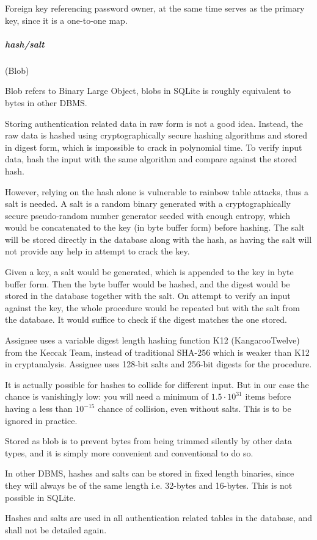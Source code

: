 Foreign key referencing password owner, at the same time serves as the primary
key, since it is a one-to-one map.

\subparagraph{hash/salt}
(Blob) \label{data-layer.design.user.tables.pswd.crypt}

Blob refers to Binary Large Object, blobs in SQLite is roughly equivalent to
bytes in other DBMS.

Storing authentication related data in raw form is not a good idea. Instead, the
raw data is hashed using cryptographically secure hashing algorithms and stored
in digest form, which is impossible to crack in polynomial time. To verify input
data, hash the input with the same algorithm and compare against the stored hash.

However, relying on the hash alone is vulnerable to rainbow table attacks, thus a
salt is needed. A salt is a random binary generated with a cryptographically
secure pseudo-random number generator seeded with enough entropy, which would be
concatenated to the key (in byte buffer form) before hashing. The salt will be
stored directly in the database along with the hash, as having the salt will not
provide any help in attempt to crack the key.

Given a key, a salt would be generated, which is appended to the key in byte buffer
form. Then the byte buffer would be hashed, and the digest would be stored in the
database together with the salt. On attempt to verify an input against the key, the
whole procedure would be repeated but with the salt from the database. It would
suffice to check if the digest matches the one stored.

Assignee uses a variable digest length hashing function K12 (KangarooTwelve)
from the Keccak Team, instead of traditional SHA-256 which is weaker than K12 in
cryptanalysis. Assignee uses 128-bit salts and 256-bit digests for the procedure.

It is actually possible for hashes to collide for different input. But in our case
the chance is vanishingly low: you will need a minimum of $1.5\cdot{}10^{31}$
items before having a less than $10^{-15}$ chance of collision, even without salts.
This is to be ignored in practice.

Stored as blob is to prevent bytes from being trimmed silently by other data
types, and it is simply more convenient and conventional to do so.

\textdagger{} In other DBMS, hashes and salts can be stored in fixed length binaries,
since they will always be of the same length i.e. 32-bytes and 16-bytes. This is
not possible in SQLite.

Hashes and salts are used in all authentication related tables in the database, and
shall not be detailed again.